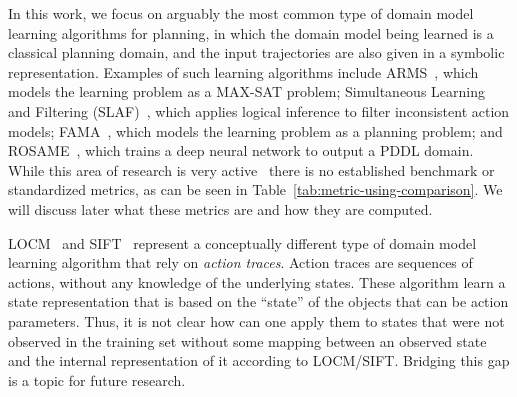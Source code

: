 \documentclass[letterpaper]{article} %
\newif\ifaddcomments
\newcommand{\roni}[1]{\ifaddcomments{\textcolor{red}{[Roni: #1]}}\fi}
\newcommand{\yarin}[1]{\ifaddcomments{\textcolor{teal}{[Yarin: #1]}}\fi}
\begin{document}
In this work, we focus on arguably the most common type of domain model learning algorithms for planning, in which the domain model being learned is a classical planning domain, and the input trajectories are also given in a symbolic representation. 
Examples of such learning algorithms include ARMS~\citep{yang2007learning}, which models the learning problem as a MAX-SAT problem; Simultaneous Learning and Filtering (SLAF)~\citep{amir2008learning}, which applies logical inference to filter inconsistent action models; FAMA~\citep{aineto2019learning}, which models the learning problem as a planning problem; and ROSAME~\cite{xi2024neuro}, which trains a deep neural network to output a PDDL domain.
While this area of research is very active~\citep{juba2021safe,mordoch2023safe,xi2024neuro,Lamanna24,LAMANNA2025104256} there is no established benchmark or standardized metrics, as can be seen in Table~\ref{tab:metric-using-comparison}. We will discuss later what these metrics are and how they are computed. 


LOCM~\citep{cresswell2011generalised} and SIFT~\citep{gosgens2024learning} represent a conceptually different type of domain model learning algorithm that rely on \emph{action traces}. Action traces are sequences of actions, without any knowledge of the underlying states. These algorithm learn a state representation that is based on the ``state'' of the objects that can be action parameters. Thus, it is not clear how can one apply them to states that were not observed in the training set without some mapping between an observed state and the internal representation of it according to LOCM/SIFT. Bridging this gap is a topic for future research.  
\roni{Super important: read the above paragraph and comment/edit}


\end{document}
